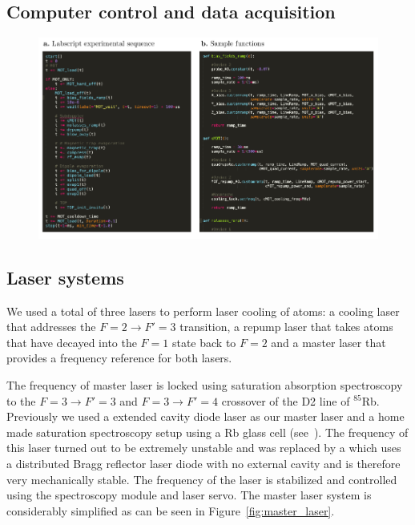 \subsection{Computer control and data acquisition}
\begin{figure}[htb]
\begin{center}
\includegraphics[]{Figures/Chapter4/labscript.pdf}
\caption[Water cooling manifold schematic]{}
\label{fig:labscript}
\end{center}
\end{figure}

\subsection{Laser systems}

We used a total of three lasers to perform laser cooling of atoms: a cooling laser that addresses the $F=2\rightarrow F'=3$ transition, a repump laser that takes atoms that have decayed into the $F=1$ state back to $F=2$ and a master laser that provides a frequency reference for both lasers. 

The frequency of master laser is locked using saturation absorption spectroscopy to the $F=3\rightarrow F'=3$ and $F=3\rightarrow F'=4$ crossover of the D2 line of $^{85}$Rb. Previously we used a  extended cavity diode laser as our master laser and a home made saturation spectroscopy setup using a Rb glass cell (see~\cite{CampbellThesis,PriceThesis}). The frequency of this laser turned out to be extremely unstable and was replaced by a  which uses a distributed Bragg reflector laser diode with no external cavity and is therefore very mechanically stable. The frequency of the laser is stabilized and controlled using the  spectroscopy module and  laser servo. The master laser system is considerably simplified as can be seen in Figure~\ref{fig:master_laser}.


